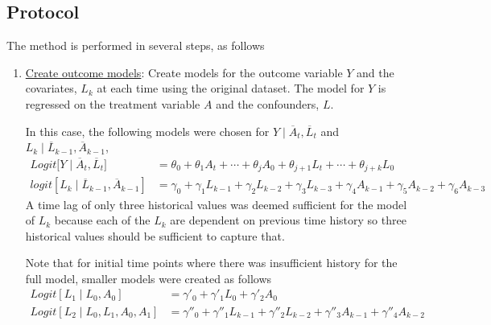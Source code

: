 
\subsection{Protocol} 
The method is performed in several steps, as follows 
\begin{enumerate}  

\item \underline{Create outcome models}: Create models for the outcome variable $Y$ and the covariates, $L_k$ at each time using the original dataset.  The model for $Y$ is regressed on the treatment variable $A$ and the confounders, $L$. 

In this case, the following models were chosen for $Y \mid  \overline{A}_t, \overline{L}_t$ and $L_k \mid \overline{L}_{k-1}, \overline{A}_{k-1}$, 
\begin{align} 
Logit \big[Y \mid \overline{A}_t, \overline{L}_t \big] &= \theta_{0} + \theta_1 A_{t} + \cdots + \theta_j A_0 + \theta_{j+1} L_t + \cdots + \theta_{j+k} L_0 \label{eq:4} \\ 
logit[L_k \mid \overline{L}_{k-1}, \overline{A}_{k-1}] &= \gamma_0 + \gamma_1 L_{k-1} + \gamma_2 L_{k-2} + \gamma_3 L_{k-3}  + \gamma_4 A_{k-1} + \gamma_5 A_{k-2} + \gamma_6 A_{k-3} \label{eq:5} 
\end{align} 
A time lag of only three historical values was deemed sufficient for the model of $L_k$ because each of the $L_k$ are dependent on previous time history so three historical values should be sufficient to capture that. 


\vspace{1cm}
Note that for initial time points where there was insufficient history for the full model, smaller models were created as follows 
\begin{align} 
Logit[L_1 \mid L_0, A_0]  &= \gamma'_0 + \gamma'_1 L_0 +  \gamma'_2 A_0 \label{eq:6} \\
Logit[L_2 \mid L_0, L_1, A_0, A_1] &= \gamma''_0 + \gamma''_1 L_{k-1} + \gamma''_2 L_{k-2}   + \gamma''_3 A_{k-1} + \gamma''_4 A_{k-2} \label{eq:7}
\end{align}



\end{enumerate}
